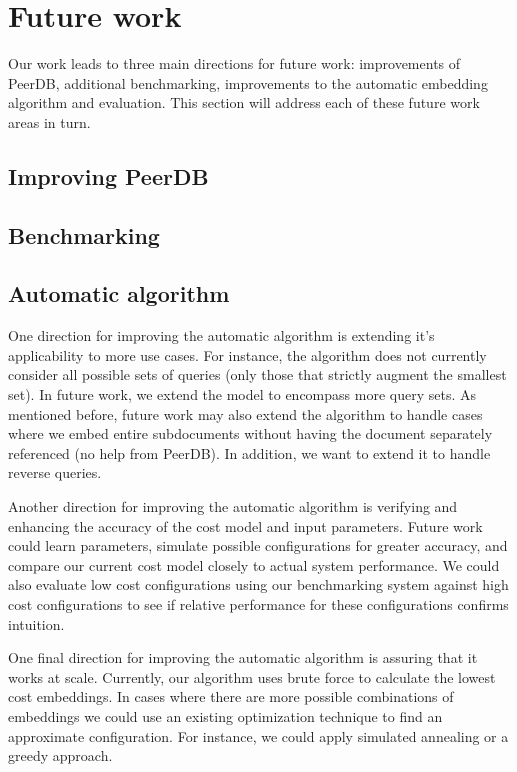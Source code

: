 \section{Future work}
Our work leads to three main directions for future work: improvements of PeerDB, additional benchmarking, improvements to the automatic embedding algorithm and evaluation.
This section will address each of these future work areas in turn.

\subsection{Improving PeerDB}

\subsection{Benchmarking}

\subsection{Automatic algorithm}
One direction for improving the automatic algorithm is extending it's applicability to more use cases. For instance, the algorithm does not currently consider all possible sets of queries (only those that strictly augment the smallest set). In future work, we extend the model to encompass more query sets. As mentioned before, future work may also extend the algorithm to handle cases where we embed entire subdocuments without having the document separately referenced (no help from PeerDB). In addition, we want to extend it to handle reverse queries.

Another direction for improving the automatic algorithm is verifying and enhancing the accuracy of the cost model and input parameters. 
Future work could learn parameters, simulate possible configurations for greater accuracy, and compare our current cost model closely to actual system performance. 
We could also evaluate low cost configurations using our benchmarking system against high cost configurations to see if relative performance for these configurations confirms intuition.

One final direction for improving the automatic algorithm is assuring that it works at scale. Currently, our algorithm uses brute force to calculate the lowest cost embeddings. In cases where there are more possible combinations of embeddings we could use an existing optimization technique to find an approximate configuration. For instance, we could apply simulated annealing or a greedy approach.
